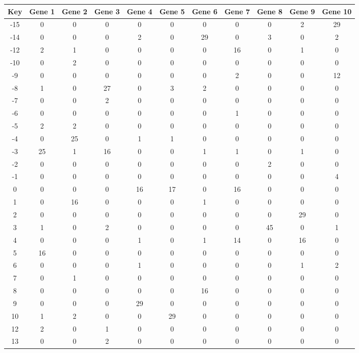 \begin{tabular}{|c|c|c|c|c|c|c|c|c|c|c|}
\hline
Key & Gene 1 & Gene 2 & Gene 3 & Gene 4 & Gene 5 & Gene 6 & Gene 7 & Gene 8 & Gene 9 & Gene 10 \\
\hline
-15 & 0 & 0 & 0 & 0 & 0 & 0 & 0 & 0 & 2 & 29 \\
-14 & 0 & 0 & 0 & 2 & 0 & 29 & 0 & 3 & 0 & 2 \\
-12 & 2 & 1 & 0 & 0 & 0 & 0 & 16 & 0 & 1 & 0 \\
-10 & 0 & 2 & 0 & 0 & 0 & 0 & 0 & 0 & 0 & 0 \\
-9 & 0 & 0 & 0 & 0 & 0 & 0 & 2 & 0 & 0 & 12 \\
-8 & 1 & 0 & 27 & 0 & 3 & 2 & 0 & 0 & 0 & 0 \\
-7 & 0 & 0 & 2 & 0 & 0 & 0 & 0 & 0 & 0 & 0 \\
-6 & 0 & 0 & 0 & 0 & 0 & 0 & 1 & 0 & 0 & 0 \\
-5 & 2 & 2 & 0 & 0 & 0 & 0 & 0 & 0 & 0 & 0 \\
-4 & 0 & 25 & 0 & 1 & 1 & 0 & 0 & 0 & 0 & 0 \\
-3 & 25 & 1 & 16 & 0 & 0 & 1 & 1 & 0 & 1 & 0 \\
-2 & 0 & 0 & 0 & 0 & 0 & 0 & 0 & 2 & 0 & 0 \\
-1 & 0 & 0 & 0 & 0 & 0 & 0 & 0 & 0 & 0 & 4 \\
0 & 0 & 0 & 0 & 16 & 17 & 0 & 16 & 0 & 0 & 0 \\
1 & 0 & 16 & 0 & 0 & 0 & 1 & 0 & 0 & 0 & 0 \\
2 & 0 & 0 & 0 & 0 & 0 & 0 & 0 & 0 & 29 & 0 \\
3 & 1 & 0 & 2 & 0 & 0 & 0 & 0 & 45 & 0 & 1 \\
4 & 0 & 0 & 0 & 1 & 0 & 1 & 14 & 0 & 16 & 0 \\
5 & 16 & 0 & 0 & 0 & 0 & 0 & 0 & 0 & 0 & 0 \\
6 & 0 & 0 & 0 & 1 & 0 & 0 & 0 & 0 & 1 & 2 \\
7 & 0 & 1 & 0 & 0 & 0 & 0 & 0 & 0 & 0 & 0 \\
8 & 0 & 0 & 0 & 0 & 0 & 16 & 0 & 0 & 0 & 0 \\
9 & 0 & 0 & 0 & 29 & 0 & 0 & 0 & 0 & 0 & 0 \\
10 & 1 & 2 & 0 & 0 & 29 & 0 & 0 & 0 & 0 & 0 \\
12 & 2 & 0 & 1 & 0 & 0 & 0 & 0 & 0 & 0 & 0 \\
13 & 0 & 0 & 2 & 0 & 0 & 0 & 0 & 0 & 0 & 0 \\
\hline
\end{tabular}
